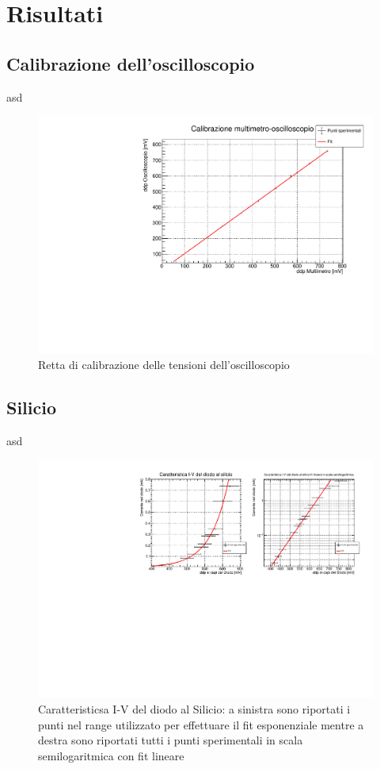 \documentclass[]{article}
\begin{document}
\section{Risultati}

\subsection{Calibrazione dell'oscilloscopio}
asd
\begin{figure}[H]
	\centering
	\includegraphics[width=0.8\linewidth]{../Silicio/Calibrazione}
	\caption{Retta di calibrazione delle tensioni dell'oscilloscopio}
	\label{fig:calibrazione}
\end{figure}

\subsection{Silicio}
asd
\begin{figure}[H]
	\centering
	\includegraphics[width=1\linewidth]{../Silicio/canvas}
	\caption{Caratteristicsa I-V del diodo al Silicio: a sinistra sono riportati i punti nel range utilizzato per effettuare il fit esponenziale mentre a destra sono riportati tutti i punti sperimentali in scala semilogaritmica con fit lineare}
	\label{fig:silicio}
\end{figure}
\end{document}

